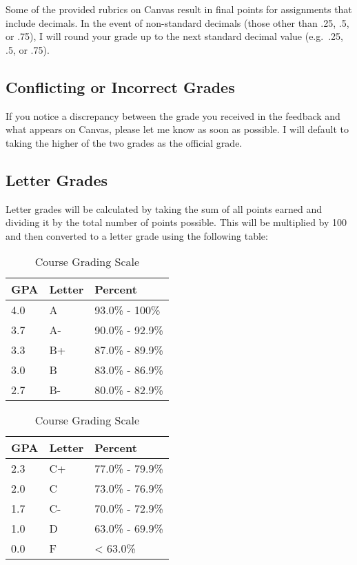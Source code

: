 \documentclass[
]{book}
\begin{document}
Some of the provided rubrics on Canvas result in final points for assignments that include decimals. In the event of non-standard decimals (those other than .25, .5, or .75), I will round your grade up to the next standard decimal value (e.g.~.25, .5, or .75).

\hypertarget{conflicting-or-incorrect-grades}{%
\subsection{Conflicting or Incorrect Grades}\label{conflicting-or-incorrect-grades}}

If you notice a discrepancy between the grade you received in the feedback and what appears on Canvas, please let me know as soon as possible. I will default to taking the higher of the two grades as the official grade.

\hypertarget{letter-grades}{%
\subsection{Letter Grades}\label{letter-grades}}

Letter grades will be calculated by taking the sum of all points earned and dividing it by the total number of points possible. This will be multiplied by 100 and then converted to a letter grade using the following table:

\begin{table}
\caption{\label{tab:unnamed-chunk-10}Course Grading Scale}

\centering
\begin{tabular}[t]{lll}
\toprule
GPA & Letter & Percent\\
\midrule
4.0 & A & 93.0\% - 100\%\\
3.7 & A- & 90.0\% - 92.9\%\\
3.3 & B+ & 87.0\% - 89.9\%\\
3.0 & B & 83.0\% - 86.9\%\\
2.7 & B- & 80.0\% - 82.9\%\\
\bottomrule
\end{tabular}
\centering
\begin{tabular}[t]{lll}
\toprule
GPA & Letter & Percent\\
\midrule
2.3 & C+ & 77.0\% - 79.9\%\\
2.0 & C & 73.0\% - 76.9\%\\
1.7 & C- & 70.0\% - 72.9\%\\
1.0 & D & 63.0\% - 69.9\%\\
0.0 & F & < 63.0\%\\
\bottomrule
\end{tabular}
\end{table}
\end{document}
